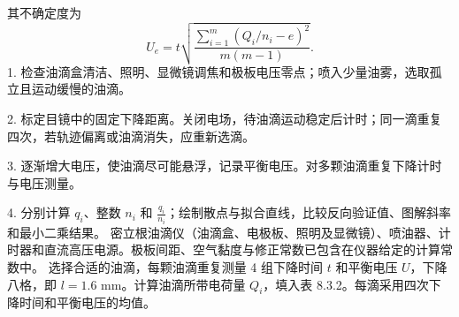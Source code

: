 其不确定度为
\begin{equation}U_e=t\sqrt{\frac{\sum_{i=1}^{m}(Q_i/n_i-e)^2}{m(m-1)}}.\tag{8.3.29}\end{equation}
1. 检查油滴盒清洁、照明、显微镜调焦和极板电压零点；喷入少量油雾，选取孤立且运动缓慢的油滴。\par
2. 标定目镜中的固定下降距离。关闭电场，待油滴运动稳定后计时；同一滴重复四次，若轨迹偏离或油滴消失，应重新选滴。\par
{}
3. 逐渐增大电压，使油滴尽可能悬浮，记录平衡电压。对多颗油滴重复下降计时与电压测量。\par
4. 分别计算 $q_i$、整数 $n_i$ 和 $\frac{q_i}{n_i}$；绘制散点与拟合直线，比较反向验证值、图解斜率和最小二乘结果。
密立根油滴仪（油滴盒、电极板、照明及显微镜）、喷油器、计时器和直流高压电源。极板间距、空气黏度与修正常数已包含在仪器给定的计算常数中。
选择合适的油滴，每颗油滴重复测量 4 组下降时间 $t$ 和平衡电压 $U$，下降八格，即 $l=1.6$ mm。计算油滴所带电荷量 $Q_i$，填入表 8.3.2。每滴采用四次下降时间和平衡电压的均值。
